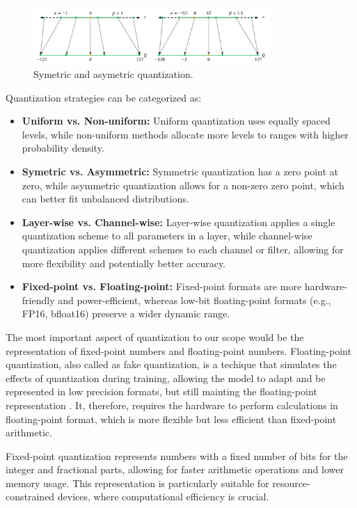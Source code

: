 \newpage
\begin{figure}
\centering
\includegraphics[width=0.8\textwidth]{figuras/2-fundamentos/quantization symetric.png}
\caption{Symetric and asymetric quantization.}
\label{fig:symmetric_quantization}
\end{figure}



Quantization strategies can be categorized as:
\begin{itemize}
    \item \textbf{Uniform vs. Non-uniform:} Uniform quantization uses equally spaced levels, while non-uniform methods allocate more levels to ranges with higher probability density.
    \item \textbf{Symetric vs. Asymmetric:} Symmetric quantization has a zero point at zero, while asymmetric quantization allows for a non-zero zero point, which can better fit unbalanced distributions.
    \item \textbf{Layer-wise vs. Channel-wise:} Layer-wise quantization applies a single quantization scheme to all parameters in a layer, while channel-wise quantization applies different schemes to each channel or filter, allowing for more flexibility and potentially better accuracy.
    \item \textbf{Fixed-point vs. Floating-point:} Fixed-point formats are more hardware-friendly and power-efficient, whereas low-bit floating-point formats (e.g., FP16, bfloat16) preserve a wider dynamic range.
\end{itemize}



The most important aspect of quantization to our scope would be the representation of fixed-point numbers and floating-point numbers. Floating-point quantization, also called as fake quantization, is a techique that simulates the effects of quantization during training, allowing the model to adapt and be represented in low precision formats, but still mainting the floating-point representation \cite{Zhu2020Survey}. It, therefore, requires the hardware to perform calculations in floating-point format, which is more flexible but less efficient than fixed-point arithmetic.

Fixed-point quantization represents numbers with a fixed number of bits for the integer and fractional parts, allowing for faster arithmetic operations and lower memory usage. This representation is particularly suitable for resource-constrained devices, where computational efficiency is crucial.

